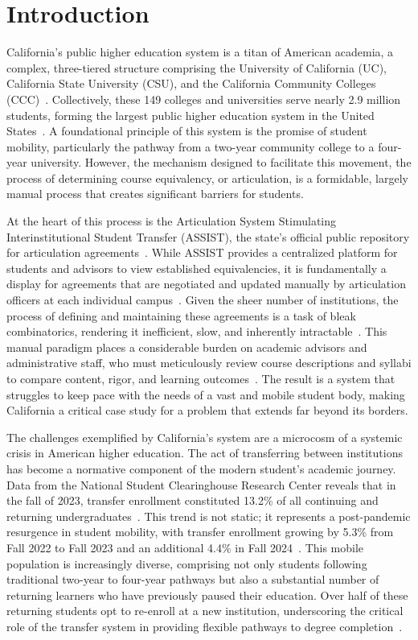 \chapter{
    Introduction
    }

California's public higher education system is a titan of American academia, a complex, three-tiered structure comprising the University of California (UC), California State University (CSU), and the California Community Colleges (CCC)~\cite{ppic}. Collectively, these 149 colleges and universities serve nearly 2.9 million students, forming the largest public higher education system in the United States~\cite{ppic,uc,calstate,cccco}. A foundational principle of this system is the promise of student mobility, particularly the pathway from a two-year community college to a four-year university. However, the mechanism designed to facilitate this movement, the process of determining course equivalency, or articulation, is a formidable, largely manual process that creates significant barriers for students.

At the heart of this process is the Articulation System Stimulating Interinstitutional Student Transfer (ASSIST), the state's official public repository for articulation agreements~\cite{assistinfo}. While ASSIST provides a centralized platform for students and advisors to view established equivalencies, it is fundamentally a display for agreements that are negotiated and updated manually by articulation officers at each individual campus~\cite{assistfaq}. Given the sheer number of institutions, the process of defining and maintaining these agreements is a task of bleak combinatorics, rendering it inefficient, slow, and inherently intractable~\cite{pardos2019}. This manual paradigm places a considerable burden on academic advisors and administrative staff, who must meticulously review course descriptions and syllabi to compare content, rigor, and learning outcomes~\cite{pardos2019}. The result is a system that struggles to keep pace with the needs of a vast and mobile student body, making California a critical case study for a problem that extends far beyond its borders.

The challenges exemplified by California's system are a microcosm of a systemic crisis in American higher education. The act of transferring between institutions has become a normative component of the modern student's academic journey. Data from the National Student Clearinghouse Research Center reveals that in the fall of 2023, transfer enrollment constituted 13.2\% of all continuing and returning undergraduates~\cite{nscnews2023}. This trend is not static; it represents a post-pandemic resurgence in student mobility, with transfer enrollment growing by 5.3\% from Fall 2022 to Fall 2023 and an additional 4.4\% in Fall 2024~\cite{nscnews2023,nscnews20250305}. This mobile population is increasingly diverse, comprising not only students following traditional two-year to four-year pathways but also a substantial number of returning learners who have previously paused their education. Over half of these returning students opt to re-enroll at a new institution, underscoring the critical role of the transfer system in providing flexible pathways to degree completion~\cite{nscdd20250507}.

